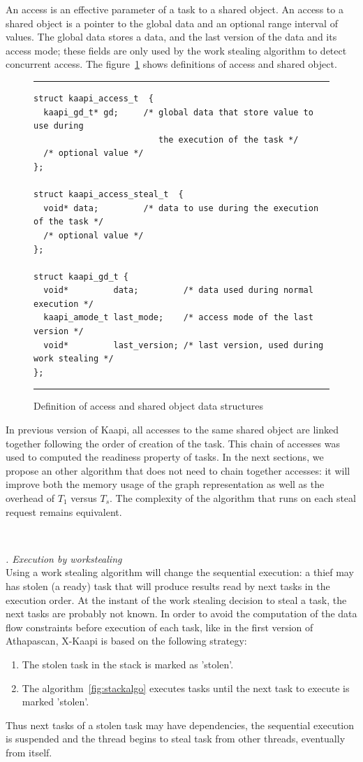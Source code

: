 \documentclass[12pt]{report}
\newcommand{\kaapi}{\textsc{X}-Kaapi\xspace}
\renewcommand{\subsubsection}[1]{~\\ \addtocounter{subsubsection}{1} \noindent\textit{
\thesubsubsection. #1\\}}
\begin{document}
An access is an effective parameter of a task to a shared object.
An access to a shared object is a pointer to the global data and an optional range interval of values.
The global data stores a data, and the last version of the data and its access mode; these fields 
are only used by the work stealing algorithm to detect concurrent access.
The figure~\ref{fig:repobject} shows definitions of access and shared object.
\begin{figure}[!h]
\hrule
\small
\begin{verbatim}
struct kaapi_access_t  {
  kaapi_gd_t* gd;     /* global data that store value to use during
                         the execution of the task */
  /* optional value */
};

struct kaapi_access_steal_t  {
  void* data;         /* data to use during the execution of the task */
  /* optional value */
};

struct kaapi_gd_t {
  void*         data;         /* data used during normal execution */
  kaapi_amode_t last_mode;    /* access mode of the last version */
  void*         last_version; /* last version, used during work stealing */
};
\end{verbatim}
\hrule
\caption{Definition of access and shared object data structures}
\label{fig:repobject}
\end{figure}
In previous version of Kaapi, all accesses to the same shared object are linked together following the order of creation of the task. This chain of accesses was used to computed the readiness property of tasks. In the next sections, we propose an other algorithm that does not need to chain together accesses: it will improve both the memory usage of the graph representation as well as the overhead of $T_1$ versus $T_s$. The complexity of the algorithm that runs on each steal request remains equivalent.

\subsubsection{Execution by workstealing}
Using a work stealing algorithm will change the sequential execution: a thief may has stolen (a ready) task that will produce results read by next tasks in the execution order. At the instant of the work stealing decision to steal a task, the next tasks are probably not known. In order to avoid the computation of the data flow constraints before execution of each task, like in the first version of Athapascan, \kaapi is based on the following strategy:
\begin{enumerate}
\item The stolen task in the stack is marked as 'stolen'.
\item The algorithm~\ref{fig:stackalgo} executes tasks until the next task to execute is marked 'stolen'.
\end{enumerate}
Thus next tasks of a stolen task may have dependencies, the sequential execution is suspended and the thread begins to steal task from other threads, eventually from itself. 
\end{document}
